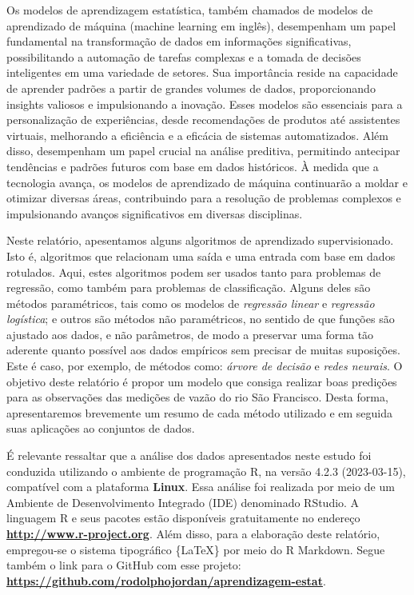 \documentclass[11pt,]{article}
\begin{document}
Os modelos de aprendizagem estatística, também chamados de modelos de
aprendizado de máquina (machine learning em inglês), desempenham um
papel fundamental na transformação de dados em informações
significativas, possibilitando a automação de tarefas complexas e a
tomada de decisões inteligentes em uma variedade de setores. Sua
importância reside na capacidade de aprender padrões a partir de grandes
volumes de dados, proporcionando insights valiosos e impulsionando a
inovação. Esses modelos são essenciais para a personalização de
experiências, desde recomendações de produtos até assistentes virtuais,
melhorando a eficiência e a eficácia de sistemas automatizados. Além
disso, desempenham um papel crucial na análise preditiva, permitindo
antecipar tendências e padrões futuros com base em dados históricos. À
medida que a tecnologia avança, os modelos de aprendizado de máquina
continuarão a moldar e otimizar diversas áreas, contribuindo para a
resolução de problemas complexos e impulsionando avanços significativos
em diversas disciplinas.

Neste relatório, apesentamos alguns algoritmos de aprendizado
supervisionado. Isto é, algoritmos que relacionam uma saída e uma
entrada com base em dados rotulados. Aqui, estes algoritmos podem ser
usados tanto para problemas de regressão, como também para problemas de
classificação. Alguns deles são métodos paramétricos, tais como os
modelos de \textit{regressão linear} e \textit{regressão logística}; e
outros são métodos não paramétricos, no sentido de que funções são
ajustado aos dados, e não parâmetros, de modo a preservar uma forma tão
aderente quanto possível aos dados empíricos sem precisar de muitas
suposições. Este é caso, por exemplo, de métodos como:
\textit{árvore de decisão} e \textit{redes neurais}. O objetivo deste
relatório é propor um modelo que consiga realizar boas predições para as
observações das medições de vazão do rio São Francisco. Desta forma,
apresentaremos brevemente um resumo de cada método utilizado e em
seguida suas aplicações ao conjuntos de dados.

É relevante ressaltar que a análise dos dados apresentados neste estudo
foi conduzida utilizando o ambiente de programação R, na versão 4.2.3
(2023-03-15), compatível com a plataforma \textbf{Linux}. Essa análise
foi realizada por meio de um Ambiente de Desenvolvimento Integrado (IDE)
denominado RStudio. A linguagem R e seus pacotes estão disponíveis
gratuitamente no endereço \href{url}{\textbf{http://www.r-project.org}}.
Além disso, para a elaboração deste relatório, empregou-se o sistema
tipográfico \{\LaTeX\} por meio do R Markdown. Segue também o link para
o GitHub com esse projeto:
\href{url}{\textbf{https://github.com/rodolphojordan/aprendizagem-estat}}.
\end{document}
